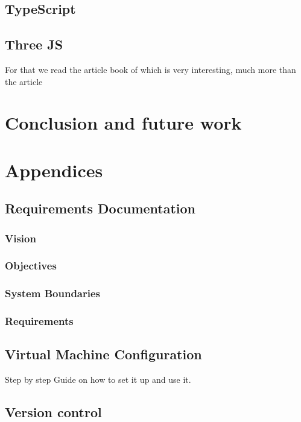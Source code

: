 \documentclass{scrartcl}
\begin{document}
\subsection{TypeScript}
\subsection{Three JS}

For that we read the article book of \cite{Jerald:2015:VBH:2792790}
which is very interesting, much more than the article
\cite{Diniz:2017:UGO:3100317.3100324}

\section{Conclusion and future work}

\section{Appendices}
\subsection{Requirements Documentation}
\subsubsection{Vision}
\subsubsection{Objectives}
\subsubsection{System Boundaries}
\subsubsection{Requirements}

\subsection{Virtual Machine Configuration}
Step by step Guide on how to set it up and use it.

\subsection{Version control}
\end{document}
